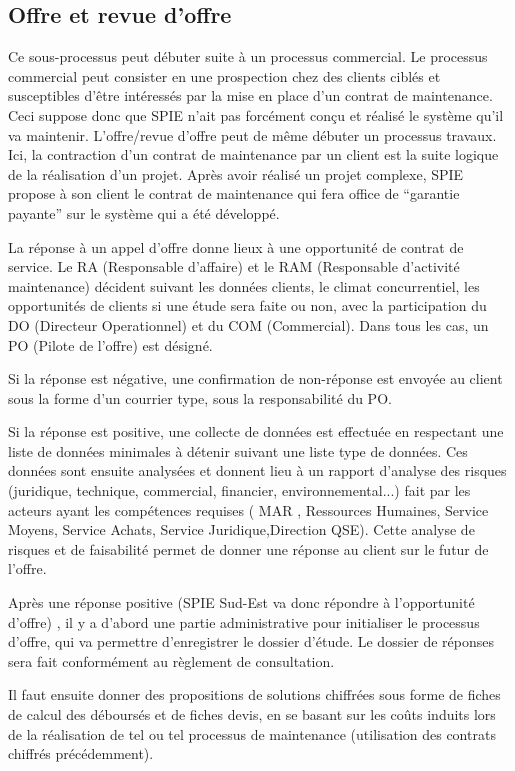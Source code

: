 \subsection{Offre et revue d’offre}

Ce sous-processus peut débuter suite à un processus commercial. Le processus commercial peut consister en une prospection chez des clients ciblés et susceptibles d’être intéressés par la mise en place d’un contrat de maintenance. Ceci suppose donc que SPIE n’ait pas forcément conçu et réalisé le système qu’il va maintenir. L’offre/revue d’offre peut de même débuter  un processus travaux. Ici, la contraction d’un contrat de maintenance par un client est la suite logique de la réalisation d’un projet. Après avoir réalisé un projet complexe, SPIE propose à son client le contrat de maintenance qui fera office de “garantie payante” sur le système qui a été développé.

La réponse à un appel d’offre donne lieux à une opportunité de contrat de service. Le RA (Responsable d’affaire) et le RAM (Responsable d’activité maintenance) décident suivant les données clients, le climat concurrentiel, les opportunités de clients si une étude sera faite ou non, avec la participation du DO (Directeur Operationnel) et du COM (Commercial). Dans tous les cas, un PO (Pilote de l’offre) est désigné.

Si la réponse est négative, une confirmation de non-réponse est envoyée au client sous la forme d’un courrier type, sous la responsabilité du PO.

Si la réponse est positive, une collecte de données est effectuée en respectant une liste de données minimales à détenir suivant une liste type de données. Ces données sont ensuite analysées et donnent lieu à un rapport d’analyse des risques (juridique, technique, commercial, financier, environnemental...)  fait par les acteurs ayant les compétences requises ( MAR , Ressources Humaines, Service Moyens, Service Achats, Service Juridique,Direction QSE). Cette analyse de risques et de faisabilité permet de donner une réponse au client sur le futur de l’offre.

Après une réponse positive (SPIE Sud-Est va donc répondre à l’opportunité d’offre) , il y a d’abord une partie administrative pour initialiser le processus d’offre, qui va permettre d’enregistrer le dossier d’étude. Le dossier de réponses sera fait conformément au règlement de consultation.

Il faut ensuite donner des propositions de solutions chiffrées sous forme de fiches de calcul des déboursés et de fiches devis, en se basant sur les coûts induits lors de la réalisation de tel ou tel processus de maintenance (utilisation des contrats chiffrés précédemment).

